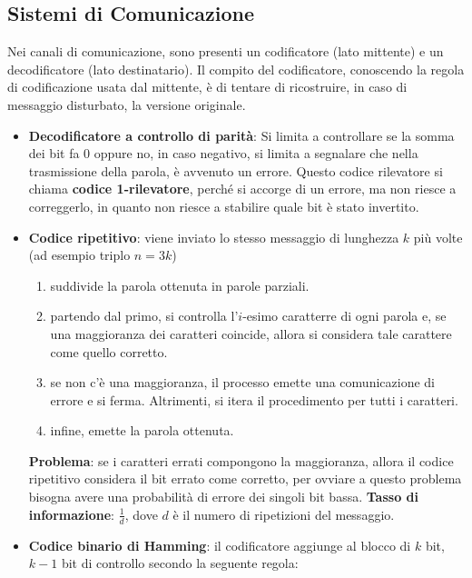 \subsection{Sistemi di Comunicazione}
Nei canali di comunicazione, sono presenti un codificatore (lato mittente) e un decodificatore (lato destinatario). Il compito del codificatore, conoscendo la regola di codificazione usata dal mittente, è di tentare di ricostruire, in caso di messaggio disturbato, la versione originale.
\begin{itemize}[nosep]
    \item \textbf{Decodificatore a controllo di parità}: Si limita a controllare se la somma dei bit fa 0 oppure no, in caso negativo, si limita a segnalare che nella trasmissione della parola, è avvenuto un errore. Questo codice rilevatore si chiama \textbf{codice 1-rilevatore}, perché si accorge di un errore, ma non riesce a correggerlo, in quanto non riesce a stabilire quale bit è stato invertito.
    \item \textbf{Codice ripetitivo}: viene inviato lo stesso messaggio di lunghezza $k$ più volte (ad esempio triplo $n = 3k$)
    \begin{enumerate}[nosep]
        \item suddivide la parola ottenuta in parole parziali.
        \item partendo dal primo, si controlla l'$i$-esimo caratterre di ogni parola e, se una maggioranza dei caratteri coincide, allora si considera tale carattere come quello corretto.
        \item se non c'è una maggioranza, il processo emette una comunicazione di errore e si ferma. Altrimenti, si itera il procedimento per tutti i caratteri.
        \item infine, emette la parola ottenuta.
    \end{enumerate}
    \textbf{Problema}: se i caratteri errati compongono la maggioranza, allora il codice ripetitivo considera il bit errato come corretto, per ovviare a questo problema bisogna avere una probabilità di errore dei singoli bit bassa. \textbf{Tasso di informazione}: $\frac{1}{d}$, dove $d$ è il numero di ripetizioni del messaggio.
    \item \textbf{Codice binario di Hamming}: il codificatore aggiunge al blocco di $k$ bit, $k - 1$ bit di controllo secondo la seguente regola:
    

\end{itemize}
